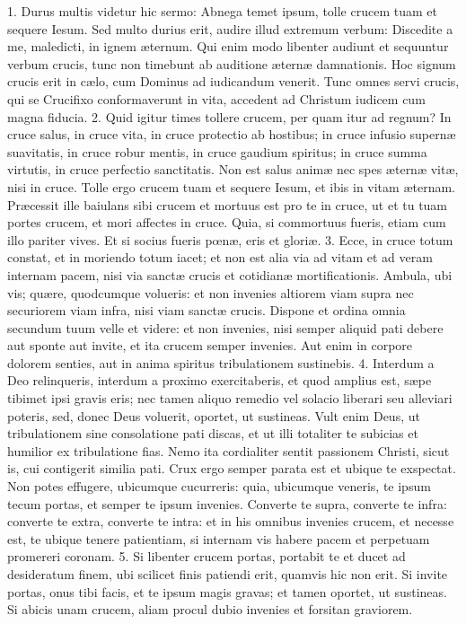 \documentclass[twoside]{article}
\begin{document}
1. Durus multis videtur hic sermo: Abnega temet ipsum, tolle crucem tuam et sequere Iesum. Sed multo durius erit, audire illud extremum verbum: Discedite a me, maledicti, in ignem æternum. Qui enim modo libenter audiunt et sequuntur verbum crucis, tunc non timebunt ab auditione æternæ damnationis. Hoc signum crucis erit in cælo, cum Dominus ad iudicandum venerit. Tunc omnes servi crucis, qui se Crucifixo conformaverunt in vita, accedent ad Christum iudicem cum magna fiducia.
2. Quid igitur times tollere crucem, per quam itur ad regnum? In cruce salus, in cruce vita, in cruce protectio ab hostibus; in cruce infusio supernæ suavitatis, in cruce robur mentis, in cruce gaudium spiritus; in cruce summa virtutis, in cruce perfectio sanctitatis. Non est salus animæ nec spes æternæ vitæ, nisi in cruce. Tolle ergo crucem tuam et sequere Iesum, et ibis in vitam æternam. Præcessit ille baiulans sibi crucem et mortuus est pro te in cruce, ut et tu tuam portes crucem, et mori affectes in cruce. Quia, si commortuus fueris, etiam cum illo pariter vives. Et si socius fueris pœnæ, eris et gloriæ.
3. Ecce, in cruce totum constat, et in moriendo totum iacet; et non est alia via ad vitam et ad veram internam pacem, nisi via sanctæ crucis et cotidianæ mortificationis. Ambula, ubi vis; quære, quodcumque volueris: et non invenies altiorem viam supra nec securiorem viam infra, nisi viam sanctæ crucis. Dispone et ordina omnia secundum tuum velle et videre: et non invenies, nisi semper aliquid pati debere aut sponte aut invite, et ita crucem semper invenies. Aut enim in corpore dolorem senties, aut in anima spiritus tribulationem sustinebis.
4. Interdum a Deo relinqueris, interdum a proximo exercitaberis, et quod amplius est, sæpe tibimet ipsi gravis eris; nec tamen aliquo remedio vel solacio liberari seu alleviari poteris, sed, donec Deus voluerit, oportet, ut sustineas. Vult enim Deus, ut tribulationem sine consolatione pati discas, et ut illi totaliter te subicias et humilior ex tribulatione fias. Nemo ita cordialiter sentit passionem Christi, sicut is, cui contigerit similia pati. Crux ergo semper parata est et ubique te exspectat. Non potes effugere, ubicumque cucurreris: quia, ubicumque veneris, te ipsum tecum portas, et semper te ipsum invenies. Converte te supra, converte te infra: converte te extra, converte te intra: et in his omnibus invenies crucem, et necesse est, te ubique tenere patientiam, si internam vis habere pacem et perpetuam promereri coronam.
5. Si libenter crucem portas, portabit te et ducet ad desideratum finem, ubi scilicet finis patiendi erit, quamvis hic non erit. Si invite portas, onus tibi facis, et te ipsum magis gravas; et tamen oportet, ut sustineas. Si abicis unam crucem, aliam procul dubio invenies et forsitan graviorem.
\end{document}
